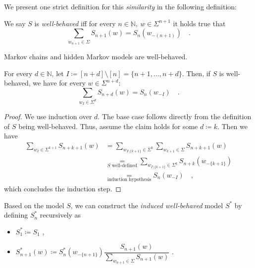 \documentclass[../../main.tex]{subfiles}
\begin{document}
    We present one strict definition for this \emph{similarity} in the following definition:

    \begin{definition}
        We say $S$ is \emph{well-behaved} iff for every $n \in \mathbb{N}, \ w \in \Sigma^{n + 1}$ it holds true that
        \[
            \sum_{w_{n + 1} \in \Sigma} S_{n + 1}(w) = S_n(w_{-(n + 1)}) \quad .
        \]
    \end{definition}

    \begin{remark}
        Markov chains and hidden Markov models are well-behaved.
    \end{remark}

    \begin{lemma}
        \label{lemma:random_variables_do_not_change_with_future_models}
        For every $d \in \mathbb{N}$, let $I \coloneqq [n + d] \setminus [n] = \{ n+1, \dots, n + d \}$. Then, if $S$ is well-behaved, we have for every $w \in \Sigma^{n + d}$:
        \[
            \sum_{w_I \in \Sigma^d} S_{n + d}(w) = S_n(w_{-I}) \quad .
        \]
    \end{lemma}
    \begin{proof}
        We use induction over $d$. The base case follows directly from the definition of $S$ being well-behaved. Thus, assume the claim holds for some $d \coloneqq k$. Then we have
        \begin{align*}
            \sum_{w_I \in \Sigma^{k + 1}} S_{n + k + 1}(w) &= \sum_{w_{I \setminus \{ k + 1 \}} \in \Sigma^{k}} \sum_{w_{k + 1} \in \Sigma} S_{n + k + 1}(w) \\
            &\underset{S \text{ well-defined}}{=} \sum_{w_{I \setminus \{ k + 1 \}} \in \Sigma^{k}} S_{n + k}(w_{-\{ k + 1 \}}) \\
            &\underset{\text{induction hypothesis}}{=} S_n(w_{-I}) \quad ,
        \end{align*}
        which concludes the induction step.
    \end{proof}

    \begin{definition}
        Based on the model $S$, we can construct the \emph{induced well-behaved} model $S^*$ by defining $S_n^*$ recursively as 
        \begin{itemize}
            \item $S_1^* \coloneqq S_1$ ,
            \item $S_{n + 1}^*(w) \coloneqq S_n^*(w_{-\{n+1\}}) \dfrac{S_{n+1}(w)}{\sum_{w_{n+1} \in \Sigma} S_{n+1}(w)}$ .
        \end{itemize}
    \end{definition}
\end{document}
